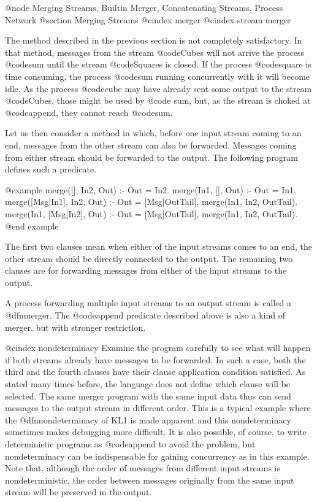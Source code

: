 {@node Merging Streams, Builtin Merger, Concatenating Streams, Process Network
@section Merging Streams
@cindex merger
@cindex stream merger

The method described in the previous section is not completely
satisfactory.  In that method, messages from the stream @code{Cubes}
will not arrive the process @code{sum} until the stream @code{Squares}
is closed.  If the process @code{square} is time consuming, the process
@code{sum} running concurrently with it will become idle.  As the
process @code{cube} may have already sent some output to the stream
@code{Cubes}, those might be used by @code{ sum}, but, as the stream is
choked at @code{append}, they cannot reach @code{sum}.

Let us then consider a method in which, before one input stream coming
to an end, messages from the other stream can also be forwarded.
Messages coming from either stream should be forwarded to the output.
The following program defines such a predicate.

@example
merge([], In2, Out) :- Out = In2.
merge(In1, [], Out) :- Out = In1.
merge([Msg|In1], In2, Out) :-
    Out = [Msg|OutTail],
    merge(In1, In2, OutTail).
merge(In1, [Msg|In2], Out) :-
    Out = [Msg|OutTail],
    merge(In1, In2, OutTail).
@end example

The first two clauses mean when either of the input streams comes to an
end, the other stream should be directly connected to the output.  The
remaining two clauses are for forwarding messages from either of the
input streams to the output.

A process forwarding multiple input streams to an output stream is
called a @dfn{merger}.  The @code{append} predicate described above is
also a kind of merger, but with stronger restriction.

@cindex nondeterminacy
Examine the program carefully to see what will happen if both streams
already have messages to be forwarded.  In such a case, both the third
and the fourth clauses have their clause application condition
satisfied.  As stated many times before, the language does not define
which clause will be selected.  The same merger program with the same
input data thus can send messages to the output stream in different
order.  This is a typical example where the @dfn{nondeterminacy} of KL1
is made apparent and this nondeterminacy sometimes makes debugging more
difficult.  It is also possible, of course, to write deterministic
programs as @code{append} to avoid the problem, but nondeterminacy can
be indispensable for gaining concurrency as in this example.  Note that,
although the order of messages from different input streams is
nondeterministic, the order between messages originally from the same
input stream will be preserved in the output.

}
